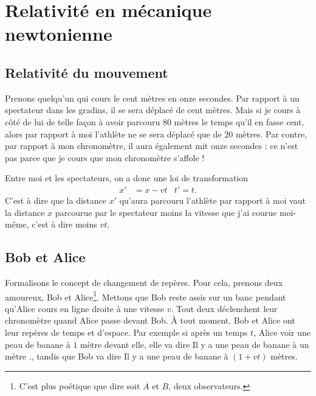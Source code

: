 
\section{Relativité en mécanique newtonienne}

\subsection{Relativité du mouvement}

Prenons quelqu'un qui cours le cent mètres en onze secondes. Par rapport à un spectateur dans les gradins, il se sera déplacé de cent mètres. Mais si je cours à côté de lui de telle façon à avoir parcouru $80$ mètres le temps qu'il en fasse cent, alors par rapport à moi l'athlète ne se sera déplacé que de $20$ mètres. Par contre, par rapport à mon chronomètre, il aura également mit onze secondes : ce n'est pas parce que je cours que mon chronomètre s'affole !

Entre moi et les spectateurs, on a donc une loi de transformation
\begin{align}		\label{EqTransGal}
x'&=x-vt&	t'=t.
\end{align}
C'est à dire que la distance $x'$ qu'aura parcouru l'athlète par rapport à moi vaut la distance $x$ parcourue par le spectateur moins la vitesse que j'ai courue moi-même, c'est à dire moins $vt$.

\subsection{Bob et Alice}

Formalisons le concept de changement de repères. Pour cela, prenons deux amoureux, Bob et Alice\footnote{C'est plus poétique que dire \og soit $A$ et $B$, deux observateurs\fg{}.}. Mettons que Bob reste assis sur un banc pendant qu'Alice cours en ligne droite à une vitesse $v$. Tout deux déclenchent leur chronomètre quand Alice passe devant Bob. À tout moment, Bob et Alice ont leur repères de temps et d'espace. Par exemple si après un temps $t$, Alice voir une peau de banane à $1$ mètre devant elle, elle va dire \og Il y a une peau de banane à un mètre .\fg{}, tandis que Bob va dire \og Il y a une peau de banane à $(1+vt)$ mètres\fg.

